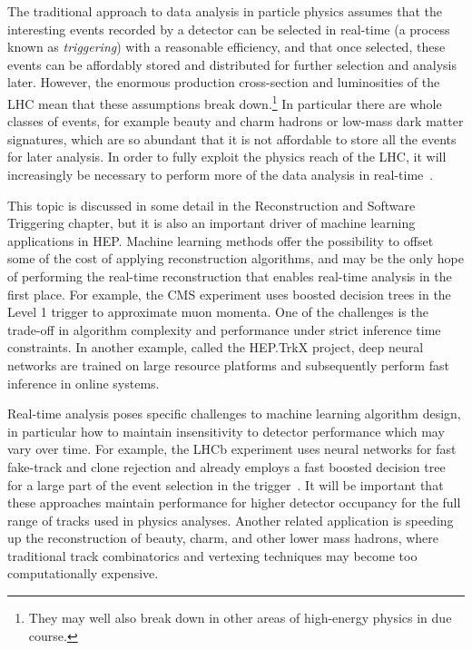 The traditional approach to data analysis in particle physics assumes that the interesting events recorded by a detector can be selected in real-time (a process known as \emph{triggering}) with a reasonable efficiency, and that once selected, these events can be affordably stored and distributed for further selection and analysis later.
However, the enormous production cross-section and luminosities of the LHC mean that these assumptions break down.\footnote{They may well also break down in other areas of high-energy physics in due course.}
In particular there are whole classes of events, for example beauty and charm hadrons or low-mass dark matter signatures, which are so abundant that it is not affordable to store all the events for later analysis. In order to fully exploit the physics reach of the LHC, it will increasingly be necessary to perform more of the data analysis in real-time~\cite{1742-6596-664-8-082004}.
\medskip

This topic is discussed in some detail in the Reconstruction and Software Triggering chapter, but it is also an important driver of machine learning applications in HEP. Machine learning methods offer the possibility to offset some of the cost of applying reconstruction algorithms, and may be the only hope of performing the real-time reconstruction that enables real-time analysis in the first place. For example, the CMS experiment uses boosted decision trees in the Level 1 trigger to approximate muon momenta. One of the challenges is the trade-off in algorithm complexity and performance under strict inference time constraints. In another example, called the HEP.TrkX project, deep neural networks are trained on large resource platforms and subsequently perform fast inference in online systems.

Real-time analysis poses specific challenges to machine learning algorithm design, in particular how to maintain insensitivity to detector performance which may vary over time. For example, the LHCb experiment uses neural networks for fast fake-track and clone rejection and already employs a fast boosted decision tree for a large part of the event selection in the trigger~\cite{Gligorov:2012qt}. It will be important that these approaches maintain performance for higher detector occupancy for the full range of tracks used in physics analyses. Another related application is speeding up the reconstruction of beauty, charm, and other lower mass hadrons, where traditional track combinatorics and vertexing techniques may become too computationally expensive.\medskip

